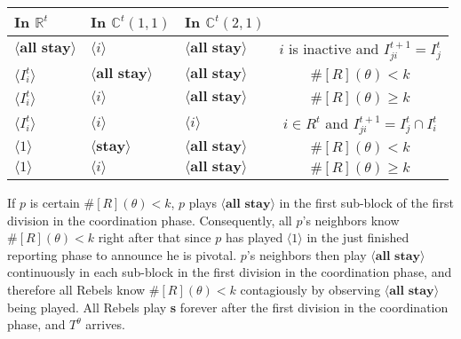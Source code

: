 \documentclass[12pt,letter]{article}
\newcommand{\Kappa}{\mathbb{C}}
\newcommand{\Omicron}{\mathbb{R}}
\theoremstyle{definition}
\theoremstyle{definition}
\theoremstyle{remark}
\theoremstyle{claim}
\begin{document}
\begin{table}[!htbp]
\begin{center}
\begin{tabular}{l l l | c}
\hline
\hline
In $\Omicron^t$			&	In $\Kappa^t(1,1)$			&			In $\Kappa^t(2,1)$		&   \\
\hline
$\langle \textbf{all stay} \rangle$  & $\langle i \rangle$	&  $\langle \textbf{all stay} \rangle$ &  $i$ is inactive and $I^{t+1}_{ji}=I^t_j$  \\
$\langle I^t_{i} \rangle$  & $\langle \textbf{all stay} \rangle$	&  $\langle \textbf{all stay} \rangle$ &  $\#[R](\theta)< k$ \\
$\langle I^t_{i} \rangle$  & $\langle i \rangle$	&  $\langle \textbf{all stay} \rangle$ &  $\#[R](\theta)\geq k$ \\
$\langle I^t_{i} \rangle$  & $\langle i \rangle$	&  $\langle i \rangle$ &  $i\in R^t$ and $I^{t+1}_{ji}=I^t_j\cap I^t_{i}$ \\
$\langle 1 \rangle$  & $\langle \textbf{stay} \rangle$	&	$\langle \textbf{all stay} \rangle$ &  $\#[R](\theta)< k$    \\
$\langle 1 \rangle$  & $\langle i \rangle$	&	$\langle \textbf{all stay} \rangle$ &  $\#[R](\theta)\geq k$  \\
  \hline
\end{tabular}
\end{center}
\end{table}


If $p$ is certain $\#[R](\theta)< k$, $p$ plays $\langle \textbf{all stay} \rangle$ in the first sub-block of the first division in the coordination phase. Consequently, all $p$'s neighbors know $\#[R](\theta)< k$ right after that since $p$ has played $\langle 1 \rangle$ in the just finished reporting phase to announce he is pivotal. $p$'s neighbors then play $\langle \textbf{all stay} \rangle$ continuously in each sub-block in the first division in the coordination phase, and therefore all Rebels know $\#[R](\theta)< k$ contagiously by observing $\langle \textbf{all stay} \rangle$ being played. All Rebels play \textbf{s} forever after the first division in the coordination phase, and $T^{\theta}$ arrives. 
\end{document}
